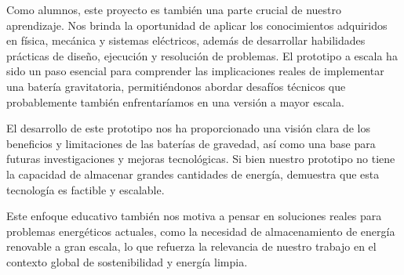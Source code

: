             Como alumnos, este proyecto es también una parte crucial de nuestro aprendizaje. Nos brinda la oportunidad de aplicar los conocimientos adquiridos en física, mecánica y sistemas eléctricos, además de desarrollar habilidades prácticas de diseño, ejecución y resolución de problemas. El prototipo a escala ha sido un paso esencial para comprender las implicaciones reales de implementar una batería gravitatoria, permitiéndonos abordar desafíos técnicos que probablemente también enfrentaríamos en una versión a mayor escala.\par
            El desarrollo de este prototipo nos ha proporcionado una visión clara de los beneficios y limitaciones de las baterías de gravedad, así como una base para futuras investigaciones y mejoras tecnológicas. Si bien nuestro prototipo no tiene la capacidad de almacenar grandes cantidades de energía, demuestra que esta tecnología es factible y escalable.\par
            Este enfoque educativo también nos motiva a pensar en soluciones reales para problemas energéticos actuales, como la necesidad de almacenamiento de energía renovable a gran escala, lo que refuerza la relevancia de nuestro trabajo en el contexto global de sostenibilidad y energía limpia.\par